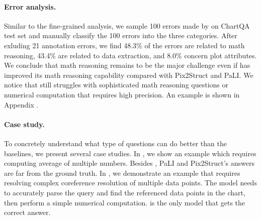 \paragraph{Error analysis.} 
 Similar to the fine-grained analysis, we sample 100 errors made by \model{} on ChartQA test set and manually classify the 100 errors into the three categories. After exluding 21 annotation errors, we find 48.3\% of the errors are related to math reasoning, 43.4\% are related to data extraction, and 8.0\% concern plot attributes. We conclude that math reasoning remains to be the major challenge even if \model{} has improved its math reasoning capability compared with Pix2Struct and PaLI. We notice that \model{} still struggles with sophisticated math reasoning questions or numerical computation that requires high precision. An example is shown in Appendix .

\paragraph{Case study.} To concretely understand what type of questions \model{} can do better than the baselines, we present several case studies. In , we show an example which requires computing average of multiple numbers. Besides \model, PaLI and Pix2Struct's answers are far from the ground truth. In , we demonstrate an example that requires resolving complex coreference resolution of multiple data points. The model needs to accurately parse the query and find the referenced data points in the chart, then perform a simple numerical computation. \model{} is the only model that gets the correct answer.

